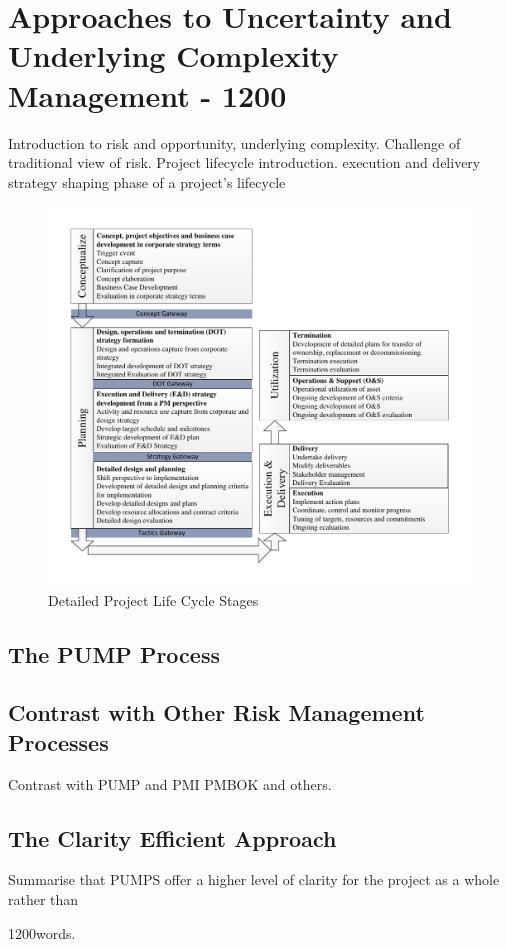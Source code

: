 
\section{Approaches to Uncertainty and Underlying Complexity Management - 1200}
Introduction to risk and opportunity, underlying complexity. 
Challenge of traditional view of risk.
Project lifecycle introduction.
 execution and delivery strategy shaping phase of a project’s lifecycle

\begin{figure}[!h]
  \centering
    \includegraphics[width = \textwidth]{./Figures/ProjectLifecycleDetailedCurve.pdf} 
\caption{Detailed Project Life Cycle Stages}
\label{Figure:Project Lifecycle}
\end{figure}

\subsection{The PUMP Process}

\subsection{Contrast with Other Risk Management Processes}
Contrast with PUMP and PMI PMBOK and others.

\subsection{The Clarity Efficient Approach}
Summarise that PUMPS offer a higher level of clarity for the project as a whole rather than 


1200words.